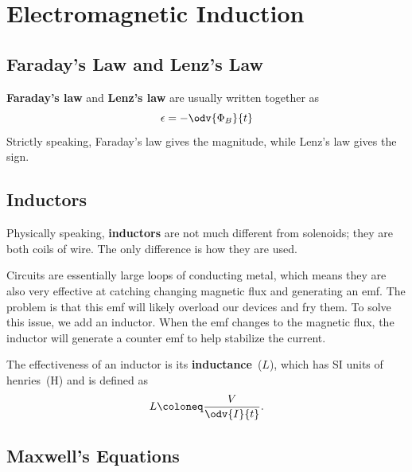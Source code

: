 \chapter{Electromagnetic Induction}

\section{Faraday's Law and Lenz's Law}

\textbf{Faraday's law} and \textbf{Lenz's law} are usually written together as
\begin{equation} \label{eq:faraday-lenz-law}
    \epsilon = - \odv{\Phi_B}{t}
\end{equation}
Strictly speaking, Faraday's law gives the magnitude,
while Lenz's law gives the sign.

\section{Inductors}

Physically speaking, \textbf{inductors} are not much different from solenoids;
they are both coils of wire.
The only difference is how they are used.

Circuits are essentially large loops of conducting metal,
which means they are also very effective at catching changing magnetic flux
and generating an emf.
The problem is that this emf will likely overload our devices and fry them.
To solve this issue, we add an inductor.
When the emf changes to the magnetic flux,
the inductor will generate a counter emf to help stabilize the current.

The effectiveness of an inductor is its \textbf{inductance}~(\(L\)),
which has SI units of henries~(\unit{\henry}) and is defined as
\begin{equation}
    L \coloneq \frac{V}{\odv{I}{t}}.
\end{equation}

\section{Maxwell's Equations}

